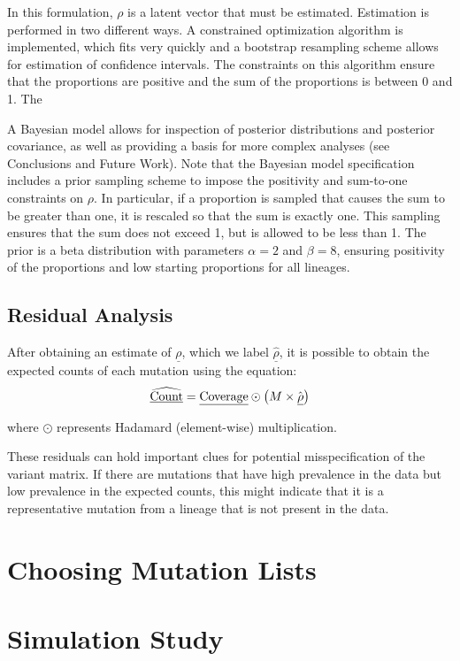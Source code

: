 \documentclass{article}
\begin{document}
In this formulation, $\rho$ is a latent vector that must be estimated.
Estimation is performed in two different ways.
A constrained optimization algorithm is implemented, which fits very quickly and a bootstrap resampling scheme allows for estimation of confidence intervals.
The constraints on this algorithm ensure that the proportions are positive and the sum of the proportions is between 0 and 1.
The 

A Bayesian model allows for inspection of posterior distributions and posterior covariance, as well as providing a basis for more complex analyses (see Conclusions and Future Work).
Note that the Bayesian model specification includes a prior sampling scheme to impose the positivity and sum-to-one constraints on $\rho$.
In particular, if a proportion is sampled that causes the sum to be greater than one, it is rescaled so that the sum is exactly one.
This sampling ensures that the sum does not exceed 1, but is allowed to be less than 1. 
The prior is a beta distribution with parameters $\alpha=2$ and $\beta=8$, ensuring positivity of the proportions and low starting proportions for all lineages.





\subsection{Residual Analysis}

After obtaining an estimate of $\underline\rho$, which we label $\hat{\underline\rho}$, it is possible to obtain the expected counts of each mutation using the equation:
$$\widehat{\text{\underline{Count}}} = \text{\underline{Coverage}}\odot\left(M\times\hat{\underline\rho}\right)$$

\noindent where $\odot$ represents Hadamard (element-wise) multiplication.

These residuals can hold important clues for potential misspecification of the variant matrix.
If there are mutations that have high prevalence in the data but low prevalence in the expected counts, this might indicate that it is a representative mutation from a lineage that is not present in the data. 

\section{Choosing Mutation Lists}

\section{Simulation Study}
\end{document}
